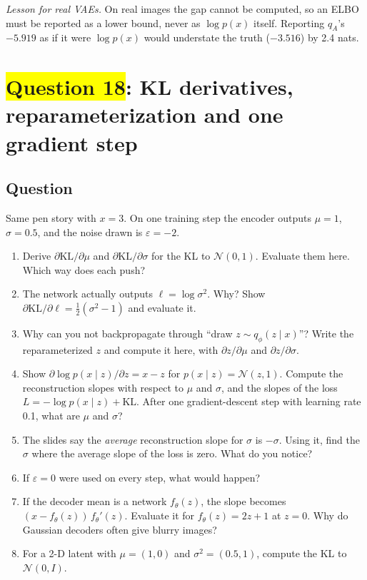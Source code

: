 \documentclass[12pt,a4paper]{article}
\begin{document}
\emph{Lesson for real VAEs.} On real images the gap cannot be computed, so an ELBO must be reported as a lower bound, never as $\log p(x)$ itself. Reporting $q_A$'s $-5.919$ as if it were $\log p(x)$ would understate the truth ($-3.516$) by 2.4 nats.
\newpage
\section{\texorpdfstring{\colorbox{yellow}{Question 18}}{Question 18}: KL derivatives, reparameterization and one gradient step}

\subsection{Question}

Same pen story with $x=3$. On one training step the encoder outputs $\mu=1$, $\sigma=0.5$, and the noise drawn is $\varepsilon=-2$.
\begin{enumerate}[label=(\alph*)]
  \item Derive $\partial\mathrm{KL}/\partial\mu$ and $\partial\mathrm{KL}/\partial\sigma$ for the KL to $\mathcal{N}(0,1)$. Evaluate them here. Which way does each push?
  \item The network actually outputs $\ell=\log\sigma^2$. Why? Show $\partial\mathrm{KL}/\partial\ell=\tfrac12(\sigma^2-1)$ and evaluate it.
  \item Why can you not backpropagate through ``draw $z\sim q_\phi(z\mid x)$''? Write the reparameterized $z$ and compute it here, with $\partial z/\partial\mu$ and $\partial z/\partial\sigma$.
  \item Show $\partial\log p(x\mid z)/\partial z=x-z$ for $p(x\mid z)=\mathcal{N}(z,1)$. Compute the reconstruction slopes with respect to $\mu$ and $\sigma$, and the slopes of the loss $L=-\log p(x\mid z)+\mathrm{KL}$. After one gradient-descent step with learning rate 0.1, what are $\mu$ and $\sigma$?
  \item The slides say the \emph{average} reconstruction slope for $\sigma$ is $-\sigma$. Using it, find the $\sigma$ where the average slope of the loss is zero. What do you notice?
  \item If $\varepsilon=0$ were used on every step, what would happen?
  \item If the decoder mean is a network $f_\theta(z)$, the slope becomes $(x-f_\theta(z))\,f_\theta'(z)$. Evaluate it for $f_\theta(z)=2z+1$ at $z=0$. Why do Gaussian decoders often give blurry images?
  \item For a 2-D latent with $\mu=(1,0)$ and $\sigma^2=(0.5,1)$, compute the KL to $\mathcal{N}(0,I)$.
\end{enumerate}
\end{document}
